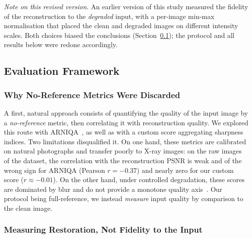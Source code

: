 \documentclass[conference]{IEEEtran}
\begin{document}
\emph{Note on this revised version.} An earlier version of this study
measured the fidelity of the reconstruction to the \emph{degraded}
input, with a per-image min-max normalisation that placed the clean and
degraded images on different intensity scales. Both choices biased the
conclusions (Section~\ref{sec:cadre}); the protocol and all results
below were redone accordingly.

\subsection{Evaluation Framework}
\label{sec:cadre}

\subsubsection{Why No-Reference Metrics Were Discarded}
\label{sec:no-ref}

A first, natural approach consists of quantifying the quality of the
input image by a \emph{no-reference} metric, then correlating it with
reconstruction quality. We explored this route with
ARNIQA~\cite{agnolucci2024arniqa}, as well as with a custom score
aggregating sharpness indices. Two limitations disqualified it. On one
hand, these metrics are calibrated on natural photographs and transfer
poorly to X-ray images: on the raw images of the dataset, the
correlation with the reconstruction PSNR is weak and of the wrong sign for
ARNIQA (Pearson $r = -0.37$) and nearly zero for our custom score
($r \approx -0.01$). On the other hand, under controlled degradation, these
scores are dominated by blur and do not provide a monotone quality
axis~\cite{agnolucci2024arniqa}. Our protocol being full-reference, we
instead \emph{measure} input quality by comparison to the clean image.

\subsubsection{Measuring Restoration, Not Fidelity to the Input}
\label{sec:measures}
\end{document}
